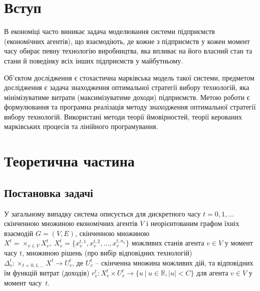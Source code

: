 \documentclass[oneside,14pt]{extarticle}
\begin{document}

\setcounter{page}{2}

\tableofcontents
\clearpage

\section{Вступ}

В економіці часто виникає\cite{David:1998} задача моделювання системи підприємств (економічних агентів), що взаємодіють, де кожне з підприємств у кожен момент часу обирає певну технологію виробництва, яка впливає на його власний стан та стани й поведінку всіх інших підприємств у майбутньому.

Об’єктом дослідження є стохастична марківська модель такої системи, предметом дослідження є задача знаходження оптимальної стратегії вибору технологій, яка мінімізуватиме витрати (максимізуватиме доходи) підприємств. Метою роботи є формулювання та програмна реалізація методу знаходження оптимальної стратегії вибору технологій. Використані методи теорії ймовірностей, теорії керованих марківських процесів та лінійного програмування. 






\section{Теоретична частина}

\subsection{Постановка задачі}

\label{sec:description}

У загальному випадку система описується\cite{Chornei:2005} для дискретного часу \(t = 0, 1, \ldots \) скінченною множиною економічних агентів \(V\) і неорієнтованим графом їхніх взаємодій \(G = (V, E)\), скінченною множиною \(X^t = \times_{v \in V}X_v^t,\ X_v^t = \{x^{t,1}_v, x^{t,2}_v, \ldots, x^{t,n_v}_v\}\) можливих станів агента \(v \in V\) у момент часу \(t\), множиною рішень (про вибір відповідних технологій) \(\Delta_v^t: \times_{t=0,1,\ldots}X^t \rightarrow U_v^t\), де \(U_v^t\) – скінченна множина можливих дій, та відповідних їм функцій витрат (доходів) \(r_v^t: X_v^t \times U_v^t \rightarrow \{u\ |\ u \in \mathbb{R}, |u| < C\}\) для агента \(v \in V\) у момент часу~\(t\).
\end{document}
